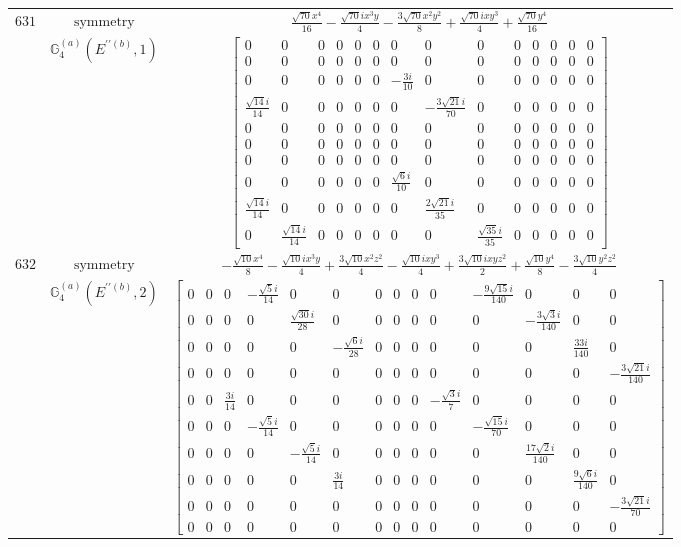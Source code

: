 \documentclass[fleqn,8pt,landscape]{jsarticle}
\begin{document}
\begin{longtable}{ccc}
$ 631 $ & $ \text{symmetry} $ & $ \frac{\sqrt{70} x^{4}}{16} - \frac{\sqrt{70} i x^{3} y}{4} - \frac{3 \sqrt{70} x^{2} y^{2}}{8} + \frac{\sqrt{70} i x y^{3}}{4} + \frac{\sqrt{70} y^{4}}{16} $ \\
$  $ & $ \mathbb{G}_{4}^{(a)}(E^{\prime\prime(b)},1) $ & $ \begin{bmatrix} 0 & 0 & 0 & 0 & 0 & 0 & 0 & 0 & 0 & 0 & 0 & 0 & 0 & 0 \\ 0 & 0 & 0 & 0 & 0 & 0 & 0 & 0 & 0 & 0 & 0 & 0 & 0 & 0 \\ 0 & 0 & 0 & 0 & 0 & 0 & - \frac{3 i}{10} & 0 & 0 & 0 & 0 & 0 & 0 & 0 \\ \frac{\sqrt{14} i}{14} & 0 & 0 & 0 & 0 & 0 & 0 & - \frac{3 \sqrt{21} i}{70} & 0 & 0 & 0 & 0 & 0 & 0 \\ 0 & 0 & 0 & 0 & 0 & 0 & 0 & 0 & 0 & 0 & 0 & 0 & 0 & 0 \\ 0 & 0 & 0 & 0 & 0 & 0 & 0 & 0 & 0 & 0 & 0 & 0 & 0 & 0 \\ 0 & 0 & 0 & 0 & 0 & 0 & 0 & 0 & 0 & 0 & 0 & 0 & 0 & 0 \\ 0 & 0 & 0 & 0 & 0 & 0 & \frac{\sqrt{6} i}{10} & 0 & 0 & 0 & 0 & 0 & 0 & 0 \\ \frac{\sqrt{14} i}{14} & 0 & 0 & 0 & 0 & 0 & 0 & \frac{2 \sqrt{21} i}{35} & 0 & 0 & 0 & 0 & 0 & 0 \\ 0 & \frac{\sqrt{14} i}{14} & 0 & 0 & 0 & 0 & 0 & 0 & \frac{\sqrt{35} i}{35} & 0 & 0 & 0 & 0 & 0 \end{bmatrix} $ \\ \hline
$ 632 $ & $ \text{symmetry} $ & $ - \frac{\sqrt{10} x^{4}}{8} - \frac{\sqrt{10} i x^{3} y}{4} + \frac{3 \sqrt{10} x^{2} z^{2}}{4} - \frac{\sqrt{10} i x y^{3}}{4} + \frac{3 \sqrt{10} i x y z^{2}}{2} + \frac{\sqrt{10} y^{4}}{8} - \frac{3 \sqrt{10} y^{2} z^{2}}{4} $ \\
$  $ & $ \mathbb{G}_{4}^{(a)}(E^{\prime\prime(b)},2) $ & $ \begin{bmatrix} 0 & 0 & 0 & - \frac{\sqrt{5} i}{14} & 0 & 0 & 0 & 0 & 0 & 0 & - \frac{9 \sqrt{15} i}{140} & 0 & 0 & 0 \\ 0 & 0 & 0 & 0 & \frac{\sqrt{30} i}{28} & 0 & 0 & 0 & 0 & 0 & 0 & - \frac{3 \sqrt{3} i}{140} & 0 & 0 \\ 0 & 0 & 0 & 0 & 0 & - \frac{\sqrt{6} i}{28} & 0 & 0 & 0 & 0 & 0 & 0 & \frac{33 i}{140} & 0 \\ 0 & 0 & 0 & 0 & 0 & 0 & 0 & 0 & 0 & 0 & 0 & 0 & 0 & - \frac{3 \sqrt{21} i}{140} \\ 0 & 0 & \frac{3 i}{14} & 0 & 0 & 0 & 0 & 0 & 0 & - \frac{\sqrt{3} i}{7} & 0 & 0 & 0 & 0 \\ 0 & 0 & 0 & - \frac{\sqrt{5} i}{14} & 0 & 0 & 0 & 0 & 0 & 0 & - \frac{\sqrt{15} i}{70} & 0 & 0 & 0 \\ 0 & 0 & 0 & 0 & - \frac{\sqrt{5} i}{14} & 0 & 0 & 0 & 0 & 0 & 0 & \frac{17 \sqrt{2} i}{140} & 0 & 0 \\ 0 & 0 & 0 & 0 & 0 & \frac{3 i}{14} & 0 & 0 & 0 & 0 & 0 & 0 & \frac{9 \sqrt{6} i}{140} & 0 \\ 0 & 0 & 0 & 0 & 0 & 0 & 0 & 0 & 0 & 0 & 0 & 0 & 0 & - \frac{3 \sqrt{21} i}{70} \\ 0 & 0 & 0 & 0 & 0 & 0 & 0 & 0 & 0 & 0 & 0 & 0 & 0 & 0 \end{bmatrix} $ \\ \hline

\end{longtable}
\end{document}
